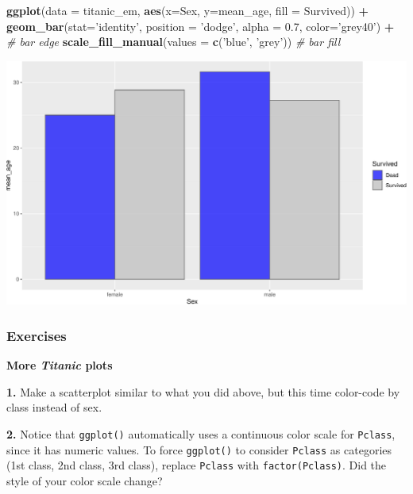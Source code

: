 \documentclass[
]{book}
\newenvironment{Shaded}{\begin{snugshade}}{\end{snugshade}}
\newcommand{\CommentTok}[1]{\textcolor[rgb]{0.56,0.35,0.01}{\textit{#1}}}
\newcommand{\DataTypeTok}[1]{\textcolor[rgb]{0.13,0.29,0.53}{#1}}
\newcommand{\FloatTok}[1]{\textcolor[rgb]{0.00,0.00,0.81}{#1}}
\newcommand{\KeywordTok}[1]{\textcolor[rgb]{0.13,0.29,0.53}{\textbf{#1}}}
\newcommand{\NormalTok}[1]{#1}
\newcommand{\OperatorTok}[1]{\textcolor[rgb]{0.81,0.36,0.00}{\textbf{#1}}}
\newcommand{\StringTok}[1]{\textcolor[rgb]{0.31,0.60,0.02}{#1}}
\begin{document}
\begin{Shaded}
\begin{Highlighting}[]
\KeywordTok{ggplot}\NormalTok{(}\DataTypeTok{data =}\NormalTok{ titanic_em, }
       \KeywordTok{aes}\NormalTok{(}\DataTypeTok{x=}\NormalTok{Sex, }\DataTypeTok{y=}\NormalTok{mean_age, }\DataTypeTok{fill =}\NormalTok{ Survived)) }\OperatorTok{+}
\StringTok{  }\KeywordTok{geom_bar}\NormalTok{(}\DataTypeTok{stat=}\StringTok{'identity'}\NormalTok{, }
           \DataTypeTok{position =} \StringTok{'dodge'}\NormalTok{, }
           \DataTypeTok{alpha =} \FloatTok{0.7}\NormalTok{, }
           \DataTypeTok{color=}\StringTok{'grey40'}\NormalTok{) }\OperatorTok{+}\StringTok{ }\CommentTok{# bar edge}
\StringTok{  }\KeywordTok{scale_fill_manual}\NormalTok{(}\DataTypeTok{values =} \KeywordTok{c}\NormalTok{(}\StringTok{'blue'}\NormalTok{, }\StringTok{'grey'}\NormalTok{)) }\CommentTok{# bar fill}
\end{Highlighting}
\end{Shaded}

\includegraphics{figures/unnamed-chunk-261-1.pdf}

\hypertarget{exercises-8}{%
\subsubsection*{Exercises}\label{exercises-8}}

\textbf{More \emph{Titanic} plots}

\textbf{1.} Make a scatterplot similar to what you did above, but this time color-code by class instead of sex.

\textbf{2.} Notice that \texttt{ggplot()} automatically uses a continuous color scale for \texttt{Pclass}, since it has numeric values. To force \texttt{ggplot()} to consider \texttt{Pclass} as categories (1st class, 2nd class, 3rd class), replace \texttt{Pclass} with \texttt{factor(Pclass)}. Did the style of your color scale change?
\end{document}
